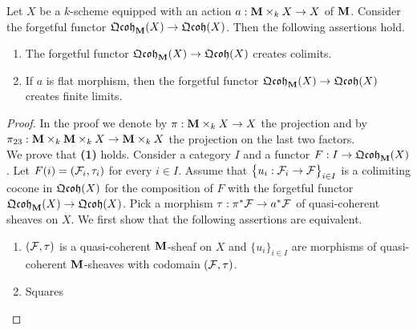\begin{theorem}\label{theorem:forgetful_functor_from_equivariant_sheaves_to_qc_sheaves_creates_colimits_and_finite_limits}
Let $X$ be a $k$-scheme equipped with an action $a:\mathbf{M}\times_kX\rightarrow X$ of $\mathbf{M}$. Consider the forgetful functor $\mathfrak{Qcoh}_{\mathbf{M}}(X)\rightarrow \mathfrak{Qcoh}(X)$. Then the following assertions hold.
\begin{enumerate}[label= \emph{\textbf{(\arabic*)}}, leftmargin=3.0em]
\item The forgetful functor $\mathfrak{Qcoh}_{\mathbf{M}}(X)\rightarrow \mathfrak{Qcoh}(X)$ creates colimits.
\item If $a$ is flat morphism, then the forgetful functor $\mathfrak{Qcoh}_{\mathbf{M}}(X)\rightarrow \mathfrak{Qcoh}(X)$ creates finite limits.
\end{enumerate}
\end{theorem}
\begin{proof}
In the proof we denote by $\pi:\mathbf{M}\times_kX\rightarrow X$ the projection and by $\pi_{23}:\mathbf{M}\times_k\mathbf{M}\times_k X\rightarrow \mathbf{M}\times_k X$ the projection on the last two factors.\\
We prove that \textbf{(1)} holds. Consider a category $I$ and a functor $F:I\rightarrow \mathfrak{Qcoh}_{\mathbf{M}}(X)$. Let $F(i) = ({\mathcal F}_i,\tau_i)$ for every $i\in I$. Assume that $\big\{u_i:{\mathcal F}_i\rightarrow {\mathcal F}\big\}_{i\in I}$ is a colimiting cocone in $\mathfrak{Qcoh}(X)$ for the composition of $F$ with the forgetful functor $\mathfrak{Qcoh}_{\mathbf{M}}(X)\rightarrow \mathfrak{Qcoh}(X)$. Pick a morphism $\tau:\pi^*{\mathcal F}\rightarrow a^*{\mathcal F}$ of quasi-coherent sheaves on $X$. We first show that the following assertions are equivalent.
\begin{enumerate}[label= \textbf{(\roman*)}, leftmargin=3.0em]
\item $({\mathcal F},\tau)$ is a quasi-coherent $\mathbf{M}$-sheaf on $X$ and $\{u_i\}_{i\in I}$ are morphisms of quasi-coherent $\mathbf{M}$-sheaves with codomain $({\mathcal F},\tau)$.
\item Squares
\begin{center}

\end{center}
\end{enumerate}
\end{proof}
